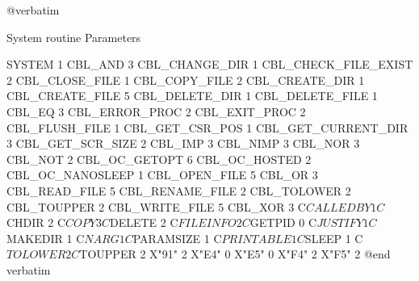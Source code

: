 @verbatim


System routine                  Parameters

SYSTEM                          1
CBL_AND                         3
CBL_CHANGE_DIR                  1
CBL_CHECK_FILE_EXIST            2
CBL_CLOSE_FILE                  1
CBL_COPY_FILE                   2
CBL_CREATE_DIR                  1
CBL_CREATE_FILE                 5
CBL_DELETE_DIR                  1
CBL_DELETE_FILE                 1
CBL_EQ                          3
CBL_ERROR_PROC                  2
CBL_EXIT_PROC                   2
CBL_FLUSH_FILE                  1
CBL_GET_CSR_POS                 1
CBL_GET_CURRENT_DIR             3
CBL_GET_SCR_SIZE                2
CBL_IMP                         3
CBL_NIMP                        3
CBL_NOR                         3
CBL_NOT                         2
CBL_OC_GETOPT                   6
CBL_OC_HOSTED                   2
CBL_OC_NANOSLEEP                1
CBL_OPEN_FILE                   5
CBL_OR                          3
CBL_READ_FILE                   5
CBL_RENAME_FILE                 2
CBL_TOLOWER                     2
CBL_TOUPPER                     2
CBL_WRITE_FILE                  5
CBL_XOR                         3
C$CALLEDBY                      1
C$CHDIR                         2
C$COPY                          3
C$DELETE                        2
C$FILEINFO                      2
C$GETPID                        0
C$JUSTIFY                       1
C$MAKEDIR                       1
C$NARG                          1
C$PARAMSIZE                     1
C$PRINTABLE                     1
C$SLEEP                         1
C$TOLOWER                       2
C$TOUPPER                       2
X"91"                           2
X"E4"                           0
X"E5"                           0
X"F4"                           2
X"F5"                           2
@end verbatim

